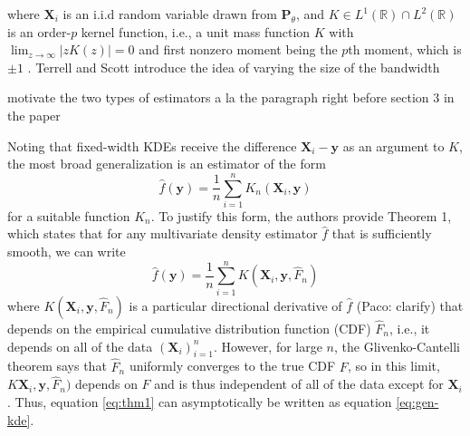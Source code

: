 \documentclass{article}
\newcommand{\R}{\mathbb{R}}
\newcommand{\abs}[1]{\left|#1\right|}
\begin{document}
where $\mathbf{X}_i$ is an i.i.d random variable drawn from $\mathbf{P}_\theta$, and $K \in L^1(\R) \cap L^2(\R)$ is an order-$p$ kernel function, i.e., a unit mass function $K$ with $\lim_{z \to \infty} \abs{zK(z)} = 0$ and first nonzero moment being the $p$th moment, which is $\pm 1$ \cite{vkde}. Terrell and Scott introduce the idea of varying the size of the bandwidth

{\color{blue} motivate the two types of estimators a la the paragraph right before section 3 in the paper}

Noting that fixed-width KDEs receive the difference $\mathbf{X}_i-\mathbf{y}$ as an argument to $K$, the most broad generalization is an estimator of the form 
\begin{equation}\label{eq:gen-kde}
    \hat{f}(\mathbf{y}) = \frac{1}{n} \sum_{i=1}^n K_n(\mathbf{X}_i,\mathbf{y}) 
\end{equation}
for a suitable function $K_n$. To justify this form, the authors provide Theorem 1, which states that for any multivariate density estimator $\hat{f}$ that is sufficiently smooth, we can write 
\begin{equation}\label{eq:thm1}
    \hat{f}(\mathbf{y}) = \frac{1}{n} \sum_{i=1}^n K(\mathbf{X}_i,\mathbf{y},\hat{F}_n)
\end{equation}
where $K(\mathbf{X}_i,\mathbf{y},\hat{F}_n)$ is a particular directional derivative of $\hat{f}$ {\color{blue} (Paco: clarify)} that depends on the empirical cumulative distribution function (CDF) $\hat{F}_n$, i.e., it depends on all of the data $(\mathbf{X}_i)_{i=1}^n$. However, for large $n$, the Glivenko-Cantelli theorem \cite{jnw} says that $\hat{F}_n$ uniformly converges to the true CDF $F$, so in this limit, $K\mathbf{X}_i,\mathbf{y},\hat{F}_n)$ depends on $F$ and is thus independent of all of the data except for $\mathbf{X}_i$. Thus, equation \eqref{eq:thm1} can asymptotically be written as equation \eqref{eq:gen-kde}. 
\end{document}
